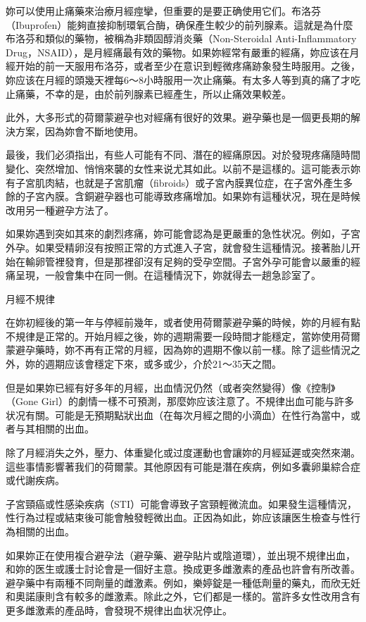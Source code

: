 \documentclass[12pt,UTF8]{ctexbook}
\begin{document}
妳可以使用止痛藥來治療月經痙攣，但重要的是要正确使用它们。布洛芬（Ibuprofen）能夠直接抑制環氧合酶，确保產生較少的前列腺素。這就是為什麼布洛芬和類似的藥物，被稱為非類固醇消炎藥（Non-Steroidal Anti-Inflammatory Drug，NSAID），是月經痛最有效的藥物。如果妳經常有嚴重的經痛，妳应该在月經开始的前一天服用布洛芬，或者至少在意识到輕微疼痛跡象發生時服用。之後，妳应该在月經的頭幾天裡每6〜8小時服用一次止痛藥。有太多人等到真的痛了才吃止痛藥，不幸的是，由於前列腺素已經產生，所以止痛效果較差。

此外，大多形式的荷爾蒙避孕也对經痛有很好的效果。避孕藥也是一個更長期的解決方案，因為妳會不斷地使用。

最後，我们必須指出，有些人可能有不同、潛在的經痛原因。对於發現疼痛隨時間變化、突然增加、悄悄來襲的女性来说尤其如此。以前不是這樣的。這可能表示妳有子宮肌肉結，也就是子宮肌瘤（fibroids）或子宮內膜異位症，在子宮外產生多餘的子宮內膜。含銅避孕器也可能導致疼痛增加。如果妳有這種状况，現在是時候改用另一種避孕方法了。

如果妳遇到突如其來的劇烈疼痛，妳可能會認為是更嚴重的急性状况。例如，子宮外孕。如果受精卵沒有按照正常的方式進入子宮，就會發生這種情況。接著胎儿开始在輸卵管裡發育，但是那裡卻沒有足夠的受孕空間。子宮外孕可能會以嚴重的經痛呈現，一般會集中在同一側。在這種情況下，妳就得去一趟急診室了。





月經不規律




在妳初經後的第一年与停經前幾年，或者使用荷爾蒙避孕藥的時候，妳的月經有點不規律是正常的。开始月經之後，妳的週期需要一段時間才能穩定，當妳使用荷爾蒙避孕藥時，妳不再有正常的月經，因為妳的週期不像以前一樣。除了這些情況之外，妳的週期应该會穩定下來，或多或少，介於21〜35天之間。

但是如果妳已經有好多年的月經，出血情況仍然（或者突然變得）像《控制》（Gone Girl）的劇情一樣不可預測，那麼妳应该注意了。不規律出血可能与許多状况有關。可能是无預期點狀出血（在每次月經之間的小滴血）在性行為當中，或者与其相關的出血。

除了月經消失之外，壓力、体重變化或过度運動也會讓妳的月經延遲或突然來潮。這些事情影響著我们的荷爾蒙。其他原因有可能是潛在疾病，例如多囊卵巢綜合症或代謝疾病。

子宮頸癌或性感染疾病（STI）可能會導致子宮頸輕微流血。如果發生這種情況，性行為过程或結束後可能會触發輕微出血。正因為如此，妳应该讓医生檢查与性行為相關的出血。

如果妳正在使用複合避孕法（避孕藥、避孕貼片或陰道環），並出現不規律出血，和妳的医生或護士討论會是一個好主意。換成更多雌激素的產品也許會有所改善。避孕藥中有兩種不同劑量的雌激素。例如，樂婷錠是一種低劑量的藥丸，而欣无妊和奧諾康則含有較多的雌激素。除此之外，它们都是一樣的。當許多女性改用含有更多雌激素的產品時，會發現不規律出血状况停止。
\end{document}
